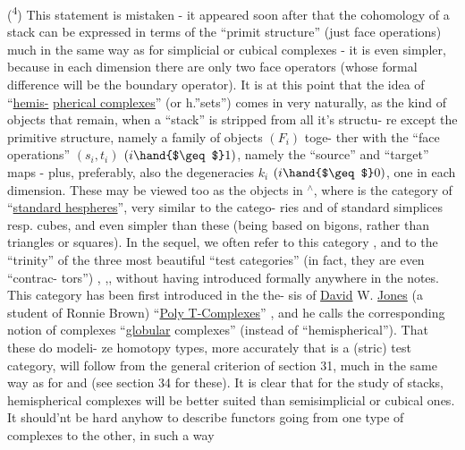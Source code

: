 (\textsuperscript{4})  This statement is mistaken - it appeared soon
after that the cohomology of a stack can be expressed in terms of the
``primit structure'' (just face operations) much in the same way as for
simplicial or cubical complexes - it is even simpler, because in each
dimension there are only two face operators (whose formal difference will
be the boundary operator). It is at this point that the idea of ``\uline{hemis-}%
\uline{pherical complexes}'' (or h.''sets'') comes in very naturally, as the kind
of objects that remain, when a ``stack'' is stripped from all it's structu-%
re except the primitive structure, namely a family of objects $(F_i)$ toge-%
ther with the ``face operations'' $(s_i,t_i)$ $(i \hand{$\geq$} 1)$, namely the ``source'' and
``target'' maps - plus, preferably, also the degeneracies $k_i$ $(i \hand{$\geq$} 0)$, one
in each dimension. These may be viewed too as the objects in \hand{$\bigcirc$}$^\wedge$, where
\hand{$\bigcirc$} is the category of ``\uline{standard hespheres}'', very similar to the catego-%
ries \hand{$\Delta$} and \hand{$\square$} of standard simplices resp. cubes, and even simpler than
these (being based on bigons, rather than triangles or squares). In the
sequel, we often refer to this category \hand{$\bigcirc$}, and to the ``trinity'' of the
three most beautiful ``test categories'' (in fact, they are even ``contrac-%
tors'')\hand{$\bigcirc$} ,\hand{$\Delta$} ,\hand{$\square$}, without having introduced formally \hand{$\bigcirc$} anywhere in the
notes.  This category \hand{$\bigcirc$} has been first introduced in the the-%
sis of \uline{David} W. \uline{Jones} (a student of Ronnie Brown) ``\uline{Poly T-Complexes}'' ,
 and he calls the corresponding notion of complexes
``\uline{globular} complexes'' (instead of ``hemispherical''). That these do modeli-%
ze homotopy types, more accurately that \hand{$\bigcirc$} is a (stric) test category,
will follow from the general criterion of section 31, much in the same
way as for\hand{$\Delta$} and \hand{$\square$}(see section 34 for these). It is clear that for the
study of stacks, hemispherical complexes will be better suited than
semisimplicial or cubical ones. It should'nt be hard anyhow to describe
functors going from one type of complexes to the other, in such a way \margin{\unsure{\S}}

